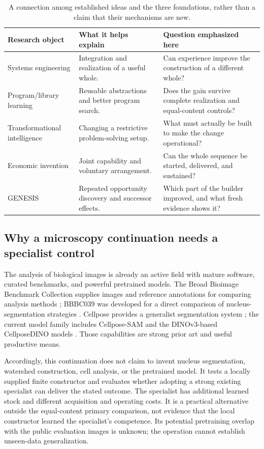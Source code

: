 \begin{table}[htbp]
\centering\small
\begin{tabularx}{\linewidth}{@{}P{1.31in}YY@{}}
\toprule
\textbf{Research object} & \textbf{What it helps explain} & \textbf{Question emphasized here}\\
\midrule
Systems engineering & Integration and realization of a useful whole. & Can experience improve the construction of a different whole?\\
Program/library learning & Reusable abstractions and better program search. & Does the gain survive complete realization and equal-content controls?\\
Transformational intelligence & Changing a restrictive problem-solving setup. & What must actually be built to make the change operational?\\
Economic invention & Joint capability and voluntary arrangement. & Can the whole sequence be started, delivered, and sustained?\\
GENESIS & Repeated opportunity discovery and successor effects. & Which part of the builder improved, and what fresh evidence shows it?\\
\bottomrule
\end{tabularx}
\caption{A connection among established ideas and the three foundations, rather than a claim that their mechanisms are new.}
\end{table}

\subsection{Why a microscopy continuation needs a specialist control}

The analysis of biological images is already an active field with mature software, curated benchmarks, and powerful pretrained models. The Broad Bioimage Benchmark Collection supplies images and reference annotations for comparing analysis methods \citep{ljosa2012,bbbc039,bbbc007}; BBBC039 was developed for a direct comparison of nucleus-segmentation strategies \citep{caicedo2019}. Cellpose provides a generalist segmentation system \citep{stringer2021}; the current model family includes Cellpose-SAM and the DINOv3-based CellposeDINO models \citep{pachitariu2025,cellposeModels}. Those capabilities are strong prior art and useful productive means.

Accordingly, this continuation does not claim to invent nucleus segmentation, watershed construction, cell analysis, or the pretrained model. It tests a locally supplied finite constructor and evaluates whether adopting a strong existing specialist can deliver the stated outcome. The specialist has additional learned stock and different acquisition and operating costs. It is a practical alternative outside the equal-content primary comparison, not evidence that the local constructor learned the specialist's competence. Its potential pretraining overlap with the public evaluation images is unknown; the operation cannot establish unseen-data generalization.


